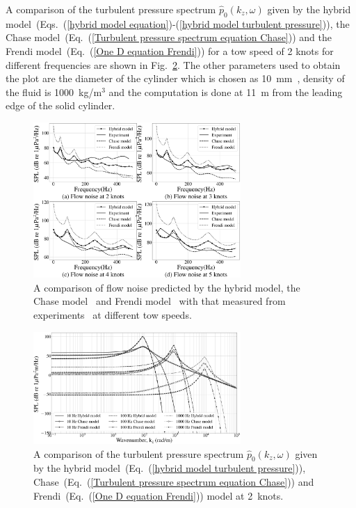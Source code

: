 \documentclass[twocolumn,10pt]{asme2ej}
\begin{document}
A comparison of the turbulent pressure spectrum $\hat{p}_0(k_z,\omega)$ given by the hybrid model~(Eqs.~(\ref{hybrid model equation})-(\ref{hybrid model turbulent pressure})), the Chase model~(Eq.~(\ref{Turbulent pressure spectrum equation Chase})) and the Frendi model~(Eq.~(\ref{One D equation Frendi})) for a tow speed of 2 knots for different frequencies are shown in Fig.~\ref{pressure comparison of hybrid model with chase and Frendi}. The other parameters used to obtain the plot are the diameter of the cylinder which is chosen as 10~mm~\cite{Unni2011}, density of the fluid is 1000~kg/m$^3$ and the computation is done at 11~m from the leading edge of the solid cylinder. 
\begin{figure}[h]
    \centering
    \includegraphics[width=3.1in]{figure/Hybrid_model_Chase_frendi_vs_Unni_comparison.eps}
    \caption{A comparison of flow noise predicted by the hybrid model, the Chase model~\cite{Chase1981} and Frendi model~\cite{frendi2020} with that measured from experiments~\cite{Unni2011} at different tow speeds.}
    \label{fig:Flow_noise_of_Hybrid_model_with_chase_frendi_and_Unnikrishnan}
\end{figure}
\begin{figure}[h]
    \centering
    \includegraphics[width=3.1in]{figure/Chase_hybrid_Frendi_outside_pressure_Spectrum.eps}
    \caption{A comparison of the turbulent pressure spectrum $\hat{p}_0(k_z,\omega)$ given by the hybrid model~(Eq.~(\ref{hybrid model turbulent pressure})), Chase~(Eq.~(\ref{Turbulent pressure spectrum equation Chase})) and Frendi~(Eq.~(\ref{One D equation Frendi})) model at 2~knots.}
    \label{pressure comparison of hybrid model with chase and Frendi}
\end{figure}
\end{document}
